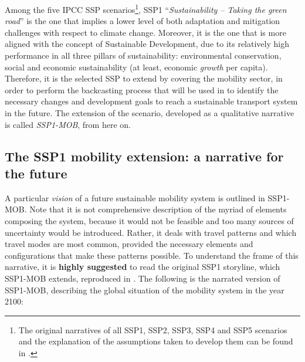 Among the five IPCC \gls{SSP} scenarios\footnote{The original narratives of all SSP1, SSP2, SSP3, SSP4 and SSP5 scenarios and the explanation of the assumptions taken to develop them can be found in \textcite{oneill2017_roadsaheadNarratives}.}, SSP1 ``\textit{Sustainability -- Taking the green road}'' is the one that implies a lower level of both adaptation and mitigation challenges with respect to climate change. Moreover, it is the one that is more aligned with the concept of Sustainable Development, due to its relatively high performance in all three pillars of sustainability: environmental conservation, social and economic sustainability (at least, economic \textit{growth} per capita). Therefore, it is the selected SSP to extend by covering the mobility sector, in order to perform the backcasting process that will be used in  to identify the necessary changes and development goals to reach a sustainable transport system in the future. The extension of the scenario, developed as a qualitative narrative is called \textit{SSP1-MOB}, from here on.

\subsection[The SSP1 mobility extension]{The SSP1 mobility extension: a narrative for the future}
\label{ss:results:ssp1-mob-development}
A particular \textit{vision} of a future sustainable mobility system is outlined in SSP1-MOB. Note that it is not comprehensive description of the myriad of elements composing the system, because it would not be feasible and too many sources of uncertainty would be introduced. Rather, it deals with travel patterns and which travel modes are most common, provided the necessary elements and configurations that make these patterns possible. To understand the frame of this narrative, it is \textbf{highly suggested} to read the original SSP1 storyline, which SSP1-MOB extends, reproduced in . The following is the narrated version of SSP1-MOB, describing the global situation of the mobility system in the year 2100:

